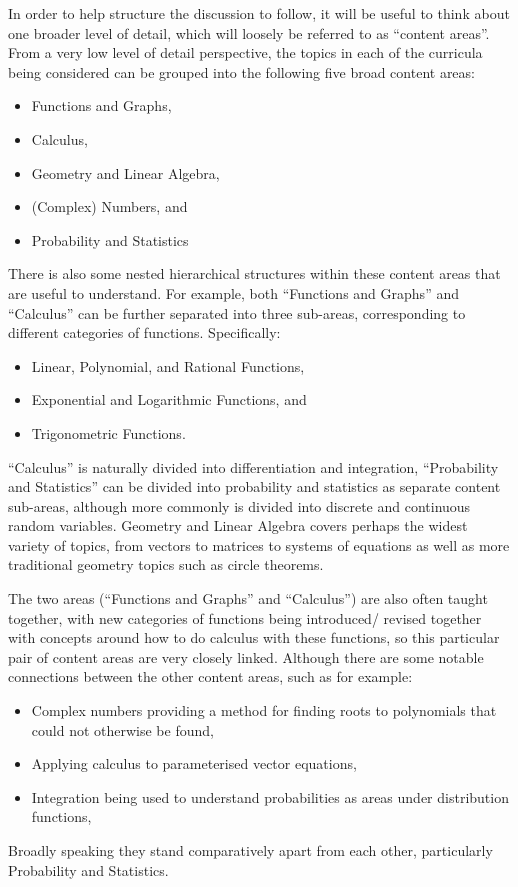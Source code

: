 \documentclass[twoside,12pt,a4paper]{report}
\begin{document}
In order to help structure the discussion to follow, it will be useful to think about one broader level of detail, which will loosely be referred to as ``content areas''. From a very low level of detail perspective, the topics in each of the curricula being considered can be grouped into the following five broad content areas:
\begin{itemize}
	\item Functions and Graphs, 
	\item Calculus, 
	\item Geometry and Linear Algebra, 
	\item (Complex) Numbers, and 
	\item Probability and Statistics	
\end{itemize}
There is also some nested hierarchical structures within these content areas that are useful to understand. For example, both ``Functions and Graphs'' and ``Calculus'' can be further separated into three sub-areas, corresponding to different categories of functions. Specifically: 
\begin{itemize}
	\item Linear, Polynomial, and Rational Functions,
	\item Exponential and Logarithmic Functions, and
	\item Trigonometric Functions.
\end{itemize} 
``Calculus'' is naturally divided into differentiation and integration, ``Probability and Statistics'' can be divided into probability and statistics as separate content sub-areas, although more commonly is divided into discrete and continuous random variables. Geometry and Linear Algebra covers perhaps the widest variety of topics, from vectors to matrices to systems of equations as well as more traditional geometry topics such as circle theorems. 

The two areas (``Functions and Graphs'' and ``Calculus'') are also often taught together, with new categories of functions being introduced/ revised together with concepts around how to do calculus with these functions, so this particular pair of content areas are very closely linked. Although there are some notable connections between the other content areas, such as for example: 
\begin{itemize}
	\item Complex numbers providing a method for finding roots to polynomials that could not otherwise be found,
	\item Applying calculus to parameterised vector equations, 
	\item Integration being used to understand probabilities as areas under distribution functions,
\end{itemize}
Broadly speaking they stand comparatively apart from each other, particularly Probability and Statistics. 
\end{document}
